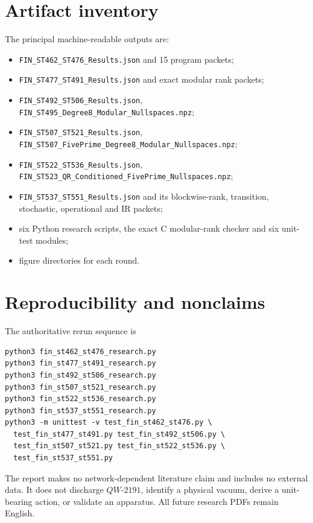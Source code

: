 \documentclass[11pt,a4paper]{article}
\theoremstyle{definition}\newtheorem{definition}[theorem]{Definition}
\theoremstyle{remark}\newtheorem{remark}[theorem]{Remark}
\begin{document}
\appendix
\section{Artifact inventory}

The principal machine-readable outputs are:
\begin{itemize}
\item \texttt{FIN\_ST462\_ST476\_Results.json} and 15 program packets;
\item \texttt{FIN\_ST477\_ST491\_Results.json} and exact modular rank packets;
\item \texttt{FIN\_ST492\_ST506\_Results.json}, \texttt{FIN\_ST495\_Degree8\_Modular\_Nullspaces.npz};
\item \texttt{FIN\_ST507\_ST521\_Results.json}, \texttt{FIN\_ST507\_FivePrime\_Degree8\_Modular\_Nullspaces.npz};
\item \texttt{FIN\_ST522\_ST536\_Results.json}, \texttt{FIN\_ST523\_QR\_Conditioned\_FivePrime\_Nullspaces.npz};
\item \texttt{FIN\_ST537\_ST551\_Results.json} and its blockwise-rank, transition, stochastic, operational and IR packets;
\item six Python research scripts, the exact C modular-rank checker and six unit-test modules;
\item figure directories for each round.
\end{itemize}

\section{Reproducibility and nonclaims}

The authoritative rerun sequence is
\begin{verbatim}
python3 fin_st462_st476_research.py
python3 fin_st477_st491_research.py
python3 fin_st492_st506_research.py
python3 fin_st507_st521_research.py
python3 fin_st522_st536_research.py
python3 fin_st537_st551_research.py
python3 -m unittest -v test_fin_st462_st476.py \
  test_fin_st477_st491.py test_fin_st492_st506.py \
  test_fin_st507_st521.py test_fin_st522_st536.py \
  test_fin_st537_st551.py
\end{verbatim}

The report makes no network-dependent literature claim and includes no external data. It does not discharge $QW\text{-}2191$, identify a physical vacuum, derive a unit-bearing action, or validate an apparatus. All future research PDFs remain English.
\end{document}
